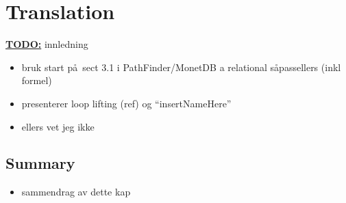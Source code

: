 \chapter{Translation}
\label{sect:translation}


\textbf{\underline{\LARGE TODO:}} innledning
\begin{itemize}
  \item bruk start p\aa~sect 3.1 i  PathFinder/MonetDB a relational s\aa passellers (inkl formel)
  \item presenterer loop lifting (ref) og ``insertNameHere''
  \item ellers vet jeg ikke
\end{itemize}





\section{Summary}
\label{sect:trans:summary}
\begin{itemize}
  \item sammendrag av dette kap
\end{itemize}